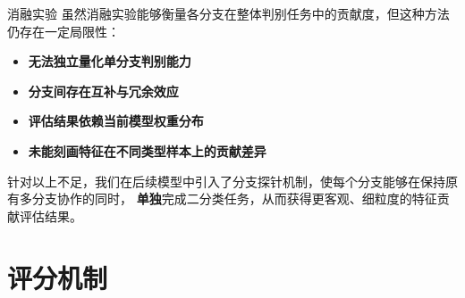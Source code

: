 \documentclass[aspectratio=169]{beamer}
\begin{document}
\begin{frame}{消融实验}
虽然消融实验能够衡量各分支在整体判别任务中的贡献度，但这种方法仍存在一定局限性：  
\begin{itemize}
  \item \textbf{无法独立量化单分支判别能力}
  \item \textbf{分支间存在互补与冗余效应}
  \item \textbf{评估结果依赖当前模型权重分布}
  \item \textbf{未能刻画特征在不同类型样本上的贡献差异}
\end{itemize}
针对以上不足，我们在后续模型中引入了分支探针机制，使每个分支能够在保持原有多分支协作的同时，
\textbf{单独}完成二分类任务，从而获得更客观、细粒度的特征贡献评估结果。

\end{frame}

%



\section{评分机制}
\end{document}
